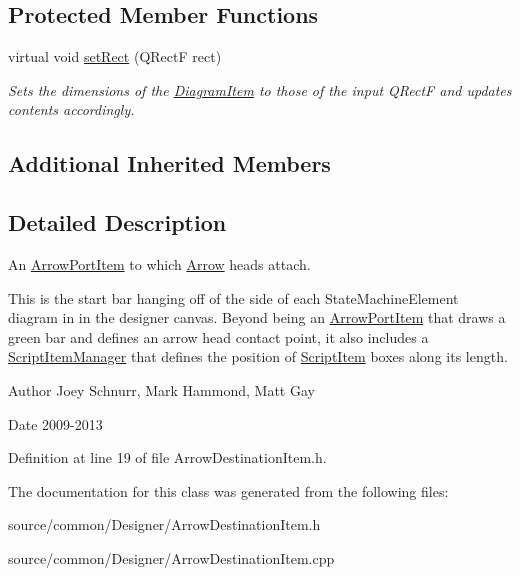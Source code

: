 \subsection*{Protected Member Functions}
\begin{DoxyCompactItemize}
\item 
\hypertarget{class_arrow_destination_item_a965162ab824f066d271b2700a4e628cb}{virtual void \hyperlink{class_arrow_destination_item_a965162ab824f066d271b2700a4e628cb}{set\-Rect} (Q\-Rect\-F rect)}\label{class_arrow_destination_item_a965162ab824f066d271b2700a4e628cb}

\begin{DoxyCompactList}\small\item\em Sets the dimensions of the \hyperlink{class_diagram_item}{Diagram\-Item} to those of the input Q\-Rect\-F and updates contents accordingly. \end{DoxyCompactList}\end{DoxyCompactItemize}
\subsection*{Additional Inherited Members}


\subsection{Detailed Description}
An \hyperlink{class_arrow_port_item}{Arrow\-Port\-Item} to which \hyperlink{class_arrow}{Arrow} heads attach. 

This is the start bar hanging off of the side of each State\-Machine\-Element diagram in in the designer canvas. Beyond being an \hyperlink{class_arrow_port_item}{Arrow\-Port\-Item} that draws a green bar and defines an arrow head contact point, it also includes a \hyperlink{class_script_item_manager}{Script\-Item\-Manager} that defines the position of \hyperlink{class_script_item}{Script\-Item} boxes along its length. \begin{DoxyAuthor}{Author}
Joey Schnurr, Mark Hammond, Matt Gay 
\end{DoxyAuthor}
\begin{DoxyDate}{Date}
2009-\/2013 
\end{DoxyDate}


Definition at line 19 of file Arrow\-Destination\-Item.\-h.



The documentation for this class was generated from the following files\-:\begin{DoxyCompactItemize}
\item 
source/common/\-Designer/Arrow\-Destination\-Item.\-h\item 
source/common/\-Designer/Arrow\-Destination\-Item.\-cpp\end{DoxyCompactItemize}

